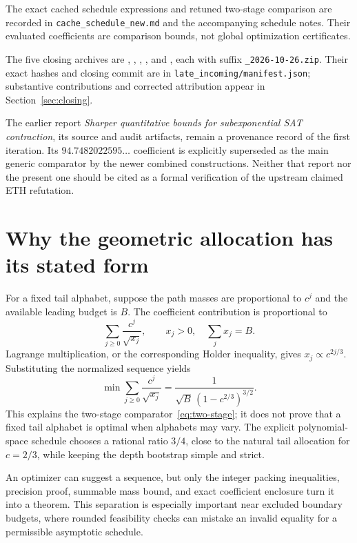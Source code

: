\documentclass[11pt,letterpaper]{article}
\theoremstyle{remark}\newtheorem{remark}[theorem]{Remark}
\begin{document}
The exact cached schedule expressions and retuned two-stage comparison are recorded in \texttt{cache\_schedule\_new.md} and the accompanying schedule notes. Their evaluated coefficients are comparison bounds, not global optimization certificates.

The five closing archives are , , , , and , each with suffix \texttt{\_2026-10-26.zip}. Their exact hashes and closing commit are in \texttt{late\_incoming/manifest.json}; substantive contributions and corrected attribution appear in Section~\ref{sec:closing}.

The earlier report \emph{Sharper quantitative bounds for subexponential SAT contraction}, its source and audit artifacts, remain a provenance record of the first iteration. Its $94.7482022595\ldots$ coefficient is explicitly superseded as the main generic comparator by the newer combined constructions. Neither that report nor the present one should be cited as a formal verification of the upstream claimed ETH refutation.

\section{Why the geometric allocation has its stated form}
For a fixed tail alphabet, suppose the path masses are proportional to $c^j$ and the available leading budget is $B$. The coefficient contribution is proportional to
\[
 \sum_{j\ge0}\frac{c^j}{\sqrt{x_j}},\qquad x_j>0,\quad\sum_jx_j=B.
\]
Lagrange multiplication, or the corresponding Holder inequality, gives $x_j\propto c^{2j/3}$. Substituting the normalized sequence yields
\[
 \min\sum_{j\ge0}\frac{c^j}{\sqrt{x_j}}
 =\frac1{\sqrt B\,(1-c^{2/3})^{3/2}}.
\]
This explains the two-stage comparator~\eqref{eq:two-stage}; it does not prove that a fixed tail alphabet is optimal when alphabets may vary. The explicit polynomial-space schedule chooses a rational ratio $3/4$, close to the natural tail allocation for $c=2/3$, while keeping the depth bootstrap simple and strict.

An optimizer can suggest a sequence, but only the integer packing inequalities, precision proof, summable mass bound, and exact coefficient enclosure turn it into a theorem. This separation is especially important near excluded boundary budgets, where rounded feasibility checks can mistake an invalid equality for a permissible asymptotic schedule.
\end{document}

